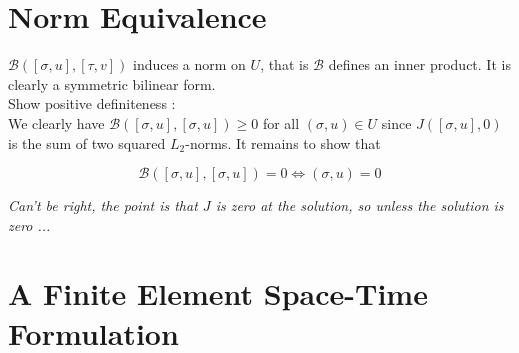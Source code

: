 \documentclass[../draft_1.tex]{subfiles}
\begin{document}
\section{Norm Equivalence}

$\mathcal{B}([\sigma, u], [\tau, v]) $ induces a norm on $U$, that is $\mathcal{B}$ defines an inner product. It is clearly a symmetric bilinear form. \\
Show positive definiteness : \\
We clearly have $\mathcal{B}([\sigma, u], [\sigma, u]) \geq 0$ for all $(\sigma, u) \in U$ since $J([\sigma, u], 0)$ is the sum of two squared $L_2$-norms. It remains to show that 
\begin{ceqn}
	\begin{equation}
\mathcal{B}([\sigma, u], [\sigma, u]) = 0  \iff (\sigma, u) = 0
\end{equation}
\end{ceqn}
\textit{Can't be right, the point is that $J$ is zero at the solution, so unless the solution is zero ...}

\section{A Finite Element Space-Time Formulation}
\end{document}
